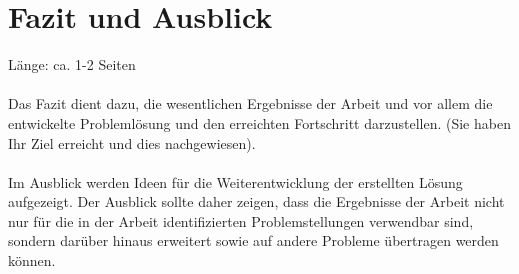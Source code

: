 \chapter{Fazit und Ausblick}
Länge: ca. 1-2 Seiten\\\\

\noindent Das Fazit dient dazu, die wesentlichen Ergebnisse der Arbeit und vor allem die entwickelte Problemlösung und den erreichten Fortschritt darzustellen. (Sie haben Ihr Ziel erreicht und dies nachgewiesen).\\\\

\noindent Im Ausblick werden Ideen für die Weiterentwicklung der erstellten Lösung aufgezeigt. Der Ausblick sollte daher zeigen, dass die Ergebnisse der Arbeit nicht nur für die in der Arbeit identifizierten Problemstellungen verwendbar sind, sondern darüber hinaus erweitert sowie auf andere Probleme übertragen werden können.

